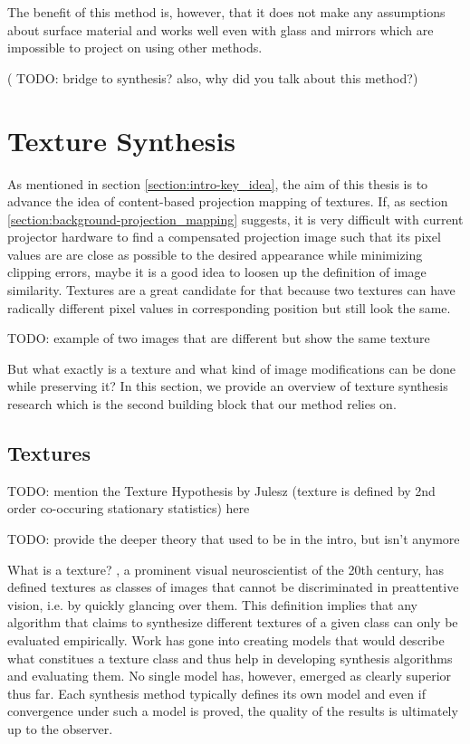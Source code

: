The benefit of this method is, however, that it does not make any assumptions about surface material and works well even with glass and mirrors which are impossible to project on using other methods.

({\color{red} TODO: bridge to synthesis? also, why did you talk about this method?})

\section{Texture Synthesis}
\label{section:background-texture_synthesis}

As mentioned in section \ref{section:intro-key_idea}, the aim of this thesis is to advance the idea of content-based projection mapping of textures. If, as section \ref{section:background-projection_mapping} suggests, it is very difficult with current projector hardware to find a compensated projection image such that its pixel values are are close as possible to the desired appearance while minimizing clipping errors, maybe it is a good idea to loosen up the definition of image similarity. Textures are a great candidate for that because two textures can have radically different pixel values in corresponding position but still look the same.

{\color{red} TODO: example of two images that are different but show the same texture}

But what exactly is a texture and what kind of image modifications can be done while preserving it? In this section, we provide an overview of texture synthesis research which is the second building block that our method relies on.

\subsection{Textures}
\label{section:background-texture_synthesis-textures}

{\color{red} TODO: mention the Texture Hypothesis by Julesz (texture is defined by 2nd order co-occuring stationary statistics) here}

{\color{red} TODO: provide the deeper theory that used to be in the intro, but isn't anymore}

What is a texture? \citet{Julesz1995}, a prominent visual neuroscientist of the 20th century, has defined textures as classes of images that cannot be discriminated in preattentive vision, i.e. by quickly glancing over them. This definition implies that any algorithm that claims to synthesize different textures of a given class can only be evaluated empirically. Work has gone into creating models that would describe what constitues a texture class and thus help in developing synthesis algorithms and evaluating them. No single model has, however, emerged as clearly superior thus far. Each synthesis method typically defines its own model and even if convergence under such a model is proved, the quality of the results is ultimately up to the observer.

